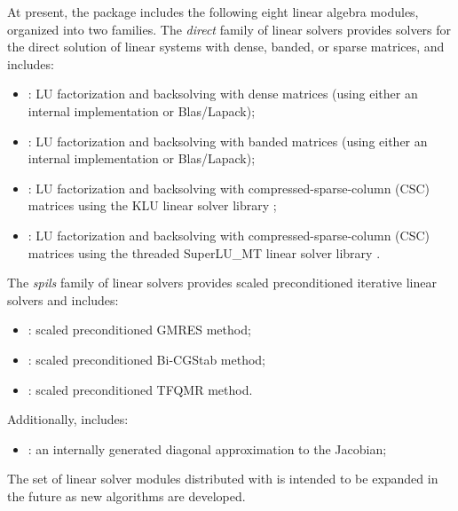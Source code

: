 At present, the package includes the following eight {\cvode} linear algebra
modules, organized into two families. The {\em direct} family of linear
solvers provides solvers for the direct solution of linear systems with
dense, banded, or sparse matrices, and includes:
\begin{itemize} 
\item {\cvdense}: LU factorization and backsolving with dense matrices
  (using either an internal implementation or Blas/Lapack); 
\item {\cvband}: LU factorization and backsolving with banded matrices
  (using either an internal implementation or Blas/Lapack); 
\item {\cvklu}: LU factorization and backsolving with
  compressed-sparse-column (CSC) matrices using the KLU linear solver
  library \cite{KLU_site};
\item {\cvsuperlumt}: LU factorization and backsolving with
  compressed-sparse-column (CSC) matrices using the threaded
  SuperLU\_MT linear solver library \cite{SuperLUMT_site}.
\end{itemize}
The {\em spils} family of linear solvers provides scaled preconditioned
iterative linear solvers and includes:
\begin{itemize} 
\item {\cvspgmr}: scaled preconditioned GMRES method;
\item {\cvspbcg}: scaled preconditioned Bi-CGStab method;
\item {\cvsptfqmr}: scaled preconditioned TFQMR method.
\end{itemize}
Additionally, {\cvode} includes:
\begin{itemize}
\item {\cvdiag}: an internally generated diagonal approximation to the 
  Jacobian; 
\end{itemize}
The set of linear solver modules distributed with {\cvode} is intended to be expanded in the
future as new algorithms are developed.

